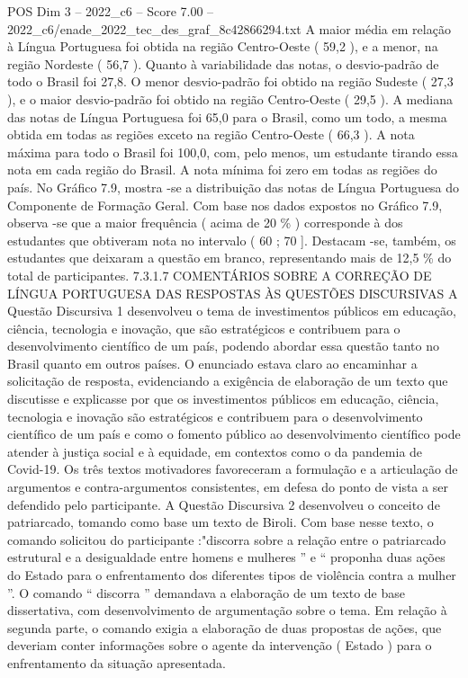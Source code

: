 \begin{textsample}{POS Dim 3 – 2022\_c6 – Score 7.00 – 2022\_c6/enade\_2022\_tec\_des\_graf\_8c42866294.txt}
A maior média em relação à Língua Portuguesa foi obtida na região Centro-Oeste ( 59,2 ), e a menor, na região Nordeste ( 56,7 ).
Quanto à variabilidade das notas, o desvio-padrão de todo o Brasil foi 27,8.
O menor desvio-padrão foi obtido na região Sudeste ( 27,3 ), e o maior desvio-padrão foi obtido na região Centro-Oeste ( 29,5 ).
A mediana das notas de Língua Portuguesa foi 65,0 para o Brasil, como um todo, a mesma obtida em todas as regiões exceto na região Centro-Oeste ( 66,3 ).
A nota máxima para todo o Brasil foi 100,0, com, pelo menos, um estudante tirando essa nota em cada região do Brasil.
A nota mínima foi zero em todas as regiões do país.
No Gráfico 7.9, mostra -se a distribuição das notas de Língua Portuguesa do Componente de Formação Geral.
Com base nos dados expostos no Gráfico 7.9, observa -se que a maior frequência ( acima de 20 \% ) corresponde à dos estudantes que obtiveram nota no intervalo ( 60 ; 70 ].
Destacam -se, também, os estudantes que deixaram a questão em branco, representando mais de 12,5 \% do total de participantes. 7.3.1.7 COMENTÁRIOS SOBRE A CORREÇÃO DE LÍNGUA PORTUGUESA DAS RESPOSTAS ÀS QUESTÕES DISCURSIVAS A Questão Discursiva 1 desenvolveu o tema de investimentos públicos em educação, ciência, tecnologia e inovação, que são estratégicos e contribuem para o desenvolvimento científico de um país, podendo abordar essa questão tanto no Brasil quanto em outros países.
O enunciado estava claro ao encaminhar a solicitação de resposta, evidenciando a exigência de elaboração de um texto que discutisse e explicasse por que os investimentos públicos em educação, ciência, tecnologia e inovação são estratégicos e contribuem para o desenvolvimento científico de um país e como o fomento público ao desenvolvimento científico pode atender à justiça social e à equidade, em contextos como o da pandemia de Covid-19.
Os três textos motivadores favoreceram a formulação e a articulação de argumentos e contra-argumentos consistentes, em defesa do ponto de vista a ser defendido pelo participante.
A Questão Discursiva 2 desenvolveu o conceito de patriarcado, tomando como base um texto de Biroli.
Com base nesse texto, o comando solicitou do participante :"discorra sobre a relação entre o patriarcado estrutural e a desigualdade entre homens e mulheres ” e “ proponha duas ações do Estado para o enfrentamento dos diferentes tipos de violência contra a mulher ”.
O comando “ discorra ” demandava a elaboração de um texto de base dissertativa, com desenvolvimento de argumentação sobre o tema.
Em relação à segunda parte, o comando exigia a elaboração de duas propostas de ações, que deveriam conter informações sobre o agente da intervenção ( Estado ) para o enfrentamento da situação apresentada.

\end{textsample}
